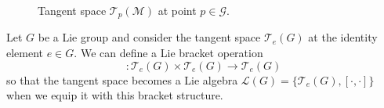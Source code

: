 \begin{figure}[htpb]
  \centering
  \def\svgwidth{0.55\columnwidth}
  
  \caption{Tangent space $\mathcal{T}_p(\mathcal{M})$ at point $p \in \mathcal{G}$.}
  \label{fig:tangentspace}
\end{figure}
\begin{claim}
  Let $G$ be a Lie group and consider the tangent space $\mathcal{T}_e (G)$ at the identity element $e \in G$.
  We can define a Lie bracket operation
  \begin{equation}
    [\cdot, \cdot]: \mathcal{T}_e(G) \times \mathcal{T}_e(G) \to \mathcal{T}_e(G)
  \end{equation}
  so that the tangent space becomes a Lie algebra $\mathscr{L}(G) = \{\mathcal{T}_e(G), [\cdot , \cdot]\}$ when we equip it with this bracket structure.
\end{claim}
